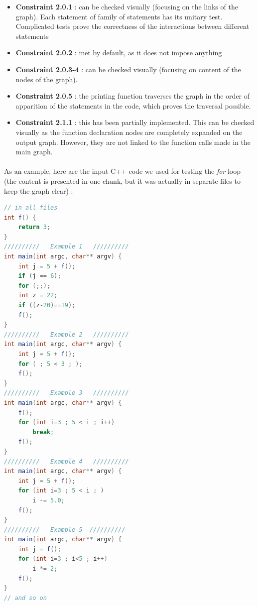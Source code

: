 \documentclass{report}
\begin{document}
\vspace{1.5mm}
\begin{itemize}
\item \textbf{Constraint 2.0.1} : can be checked visually (focusing on the links of the graph). Each statement of family of statements has its unitary test. Complicated tests prove the correctness of the interactions between different statements\vspace{1mm}
\item \textbf{Constraint 2.0.2} : met by default, as it does not impose anything\vspace{1mm}
\item \textbf{Constraint 2.0.3-4} : can be checked visually (focusing on content of the nodes of the graph).\vspace{1mm}
\item \textbf{Constraint 2.0.5} : the printing function traverses the graph in the order of apparition of the statements in the code, which proves the traversal possible.\vspace{1mm}
\item \textbf{Constraint 2.1.1} : this has been partially implemented. This can be checked visually as the function declaration nodes are completely expanded on the output graph. However, they are not linked to the function calls made in the main graph.\vspace{1mm}
\end{itemize}

\paragraph{}
\hspace{4mm}As an example, here are the input C++ code we used for testing the \textit{for} loop 
(the content is presented in one chunk, but it was actually in separate files to keep the graph clear) :

\begin{lstlisting}[language=java]
// in all files 
int f() {
    return 3;
}
//////////   Example 1   //////////
int main(int argc, char** argv) {
    int j = 5 + f();
    if (j == 6);
    for (;;);
    int z = 22;
    if ((z-20)==19);
    f();
}
//////////   Example 2   //////////
int main(int argc, char** argv) {
    int j = 5 + f();
    for ( ; 5 < 3 ; );
    f();
}
//////////   Example 3   //////////
int main(int argc, char** argv) {
    f();
    for (int i=3 ; 5 < i ; i++)
        break;
    f();
}
//////////   Example 4   //////////
int main(int argc, char** argv) {
    int j = 5 + f();
    for (int i=3 ; 5 < i ; )
        i -= 5.0;
    f();
}
//////////   Example 5  //////////
int main(int argc, char** argv) {
    int j = f();
    for (int i=3 ; i<5 ; i++)
        i *= 2;
    f();
}
// and so on
\end{lstlisting}
\end{document}
